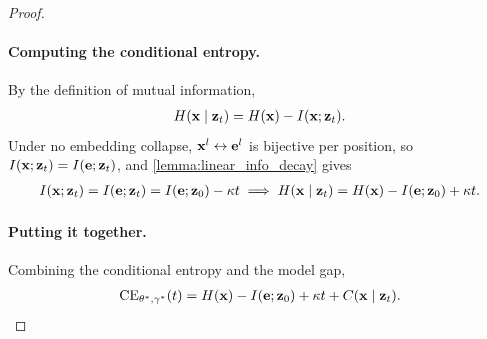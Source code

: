 \documentclass{article}
\begin{document}
\begin{proof}
\paragraph{Computing the conditional entropy.}
By the definition of mutual information,
\begin{align}
    H({\mathbf x}\mid{\mathbf z}_t) = H({\mathbf x}) - I({\mathbf x};{\mathbf z}_t).
\end{align}
Under no embedding collapse, ${\mathbf x}^l\leftrightarrow{\mathbf e}^l$ is bijective per position, so $I({\mathbf x};{\mathbf z}_t)=I({\mathbf e};{\mathbf z}_t)$, and \cref{lemma:linear_info_decay} gives
\begin{align}
    I({\mathbf x};{\mathbf z}_t)=I({\mathbf e};{\mathbf z}_t) = I({\mathbf e};{\mathbf z}_0) - \kappa t \implies H({\mathbf x}\mid{\mathbf z}_t) = H({\mathbf x}) - I({\mathbf e};{\mathbf z}_0) + \kappa t.
\end{align}

\paragraph{Putting it together.}
Combining the conditional entropy and the model gap,
\begin{align}
    \operatorname{CE}_{\theta^*,\gamma^*}(t) = H({\mathbf x}) - I({\mathbf e};{\mathbf z}_0) + \kappa t + C({\mathbf x}\mid{\mathbf z}_t).
\end{align}
%
%


\end{proof}
\end{document}
